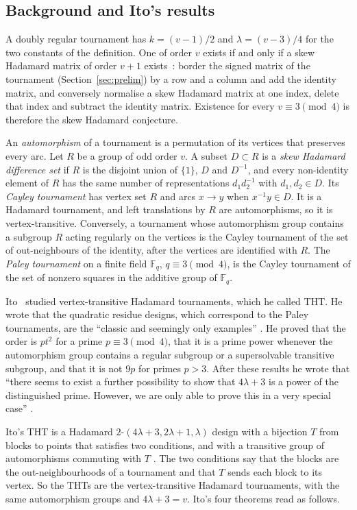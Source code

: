 \documentclass[11pt]{amsart}
\theoremstyle{definition}
\theoremstyle{remark}
\newcommand{\F}{\mathbb{F}}
\begin{document}
\subsection*{Background and Ito's results}
A doubly regular tournament has $k=(v-1)/2$ and $\lambda=(v-3)/4$ for the two constants of the definition. One of order $v$ exists if and only if a skew Hadamard matrix of order $v+1$ exists~\cite{RB72}: border the signed matrix of the tournament (Section~\ref{sec:prelim}) by a row and a column and add the identity matrix, and conversely normalise a skew Hadamard matrix at one index, delete that index and subtract the identity matrix. Existence for every $v\equiv3\pmod4$ is therefore the skew Hadamard conjecture.

An \emph{automorphism} of a tournament is a permutation of its vertices that preserves every arc. Let $R$ be a group of odd order $v$. A subset $D\subset R$ is a \emph{skew Hadamard difference set} if $R$ is the disjoint union of $\{1\}$, $D$ and $D^{-1}$, and every non-identity element of $R$ has the same number of representations $d_1d_2^{-1}$ with $d_1,d_2\in D$. Its \emph{Cayley tournament} has vertex set $R$ and arcs $x\to y$ when $x^{-1}y\in D$. It is a Hadamard tournament, and left translations by $R$ are automorphisms, so it is vertex-transitive. Conversely, a tournament whose automorphism group contains a subgroup $R$ acting regularly on the vertices is the Cayley tournament of the set of out-neighbours of the identity, after the vertices are identified with $R$. The \emph{Paley tournament} on a finite field $\F_q$, $q\equiv3\pmod4$, is the Cayley tournament of the set of nonzero squares in the additive group of $\F_q$.

Ito~\cite{Ito84} studied vertex-transitive Hadamard tournaments, which he called THT. He wrote that the quadratic residue designs, which correspond to the Paley tournaments, are the ``classic and seemingly only examples'' \cite[p.~37]{Ito84}. He proved that the order is $pt^2$ for a prime $p\equiv3\pmod4$, that it is a prime power whenever the automorphism group contains a regular subgroup or a supersolvable transitive subgroup, and that it is not $9p$ for primes $p>3$. After these results he wrote that ``there seems to exist a further possibility to show that $4\lambda+3$ is a power of the distinguished prime. However, we are only able to prove this in a very special case'' \cite[p.~41]{Ito84}.

Ito's THT is a Hadamard $2$-$(4\lambda+3,2\lambda+1,\lambda)$ design with a bijection $T$ from blocks to points that satisfies two conditions, and with a transitive group of automorphisms commuting with $T$ \cite[p.~37]{Ito84}. The two conditions say that the blocks are the out-neighbourhoods of a tournament and that $T$ sends each block to its vertex. So the THTs are the vertex-transitive Hadamard tournaments, with the same automorphism groups and $4\lambda+3=v$. Ito's four theorems read as follows.
\end{document}
